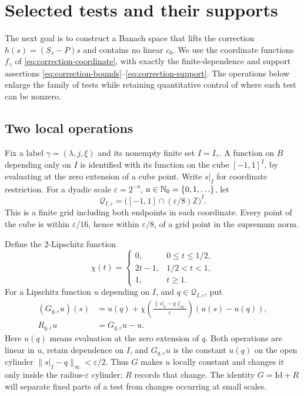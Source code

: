 \section{Selected tests and their supports}\label{sec:tests}

The next goal is to construct a Banach space that lifts the correction
\(h(s)=(S_s-P)s\) and contains no linear \(c_0\). We use the coordinate
functions \(f_\gamma\) of \eqref{eq:correction-coordinate}, with exactly the finite-dependence and
support assertions \eqref{eq:correction-bounds}--\eqref{eq:correction-support}. The operations below enlarge the family
of tests while retaining quantitative control of where each test can
be nonzero.

\subsection{Two local operations}

Fix a label \(\gamma=(\lambda,j,\xi)\) and its nonempty finite set
\(I=I_\gamma\). A function on \(B\) depending only on \(I\) is
identified with its function on the cube \([-1,1]^I\), by evaluating
at the zero extension of a cube point. Write \(s|_I\) for coordinate
restriction. For a dyadic scale \(\varepsilon=2^{-a}\),
\(a\in\mathbb N_0=\{0,1,\ldots\}\), let
\[
 \mathcal Q_{I,\varepsilon}
   =\bigl([-1,1]\cap(\varepsilon/8)\mathbb Z\bigr)^I .
\]
This is a finite grid including both endpoints in each coordinate.
Every point of the cube is within \(\varepsilon/16\), hence within
\(\varepsilon/8\), of a grid point in the supremum norm.

Define the \(2\)-Lipschitz function
\[
 \chi(t)=
 \begin{cases}
 0,&0\leq t\leq1/2,\\
 2t-1,&1/2<t<1,\\
 1,&t\geq1.
 \end{cases}
\]
For a Lipschitz function \(u\) depending on \(I\), and
\(q\in\mathcal Q_{I,\varepsilon}\), put
\begin{align}
 (G_{q,\varepsilon}u)(s)
 &=u(q)+\chi\!\left(\frac{\|s|_I-q\|_\infty}{\varepsilon}\right)
                    (u(s)-u(q)), \label{eq:G}\\
 R_{q,\varepsilon}u&=G_{q,\varepsilon}u-u. \label{eq:R}
\end{align}
Here \(u(q)\) means evaluation at the zero extension of \(q\).
Both operations are linear in \(u\), retain dependence on \(I\), and
\(G_{q,\varepsilon}u\) is the constant \(u(q)\) on the open cylinder
\(\|s|_I-q\|_\infty<\varepsilon/2\).
Thus \(G\) makes \(u\) locally constant and changes it only inside
the radius-\(\varepsilon\) cylinder; \(R\) records that change.
The identity \(G=\mathrm{Id}+R\) will separate fixed parts of a test
from changes occurring at small scales.

